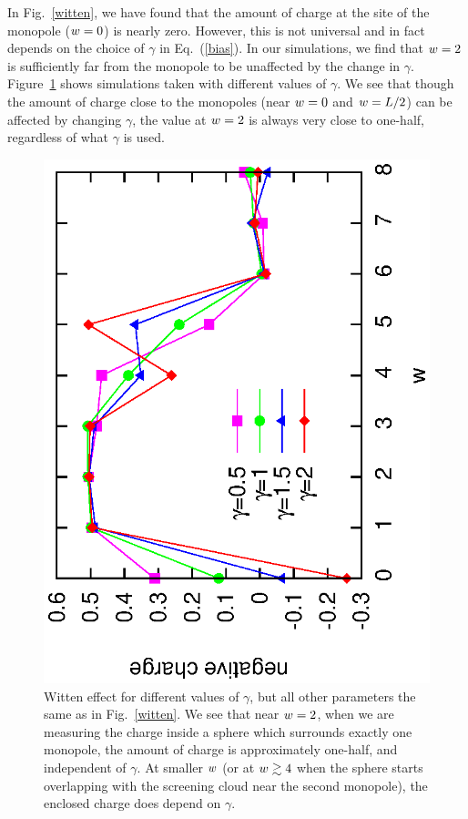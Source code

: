 In Fig.~\ref{witten}, we have found that the amount of charge at the site of the monopole ($\scripty{r}=0$) is nearly zero. However, this is not universal and in fact depends on the choice of $\gamma$ in Eq.~(\ref{bias}). 
In our simulations, we find that $\scripty{r}=2$ is sufficiently far from the monopole to be unaffected by the change in $\gamma$. Figure~\ref{diffgamma} shows simulations taken with different values of $\gamma$. We see that though the amount of charge close to the monopoles (near $\scripty{r}=0$ and $\scripty{r}=L/2$) can be affected by changing $\gamma$, the value at $\scripty{r}=2$ is always very close to one-half, regardless of what $\gamma$ is used.

\begin{figure}
\includegraphics[angle=-90,width=\linewidth]{figures/wittendiff.eps}
\caption{Witten effect for different values of $\gamma$, but all other parameters the same as in Fig.~\ref{witten}. We see that near $\scripty{r}=2$, when we are measuring the charge inside a sphere which surrounds exactly one monopole, the amount of charge is approximately one-half, and independent of $\gamma$. At smaller $\scripty{r}$ (or at $\scripty{r} \gtrsim 4$ when the sphere starts overlapping with the screening cloud near the second monopole), the enclosed charge does depend on $\gamma$.}
\label{diffgamma}
\end{figure}

